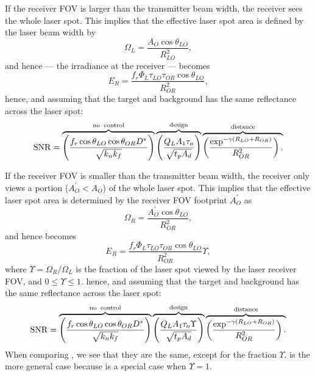 If the receiver FOV  is larger than the transmitter beam width, the receiver sees the whole laser spot. This implies that the effective laser spot area is defined by the laser beam width by
\begin{equation}
\Omega_L=\frac{A_O\cos\theta_{LO}}{R^2_{LO}},
\end{equation}
and hence  --- the irradiance at the receiver ---  becomes
\begin{equation}
E_R = \frac{
f_r  \Phi_L \tau_{LO}\tau_{OR} \cos\theta_{LO}}{R^2_{OR} }\label{lrfi1}, 
\end{equation}
hence, and assuming that the target and background has the same reflectance across the laser spot:
\begin{equation}
\operatorname{SNR}=
\overbrace{
\left(\frac{f_r \cos\theta_{LO} \cos\theta_{OR} D^\ast }{\sqrt{k_nk_f}}\right)
}^{\rm no\;\;control}
\overbrace{
\left(\frac{Q_L A_1 \tau_o }{\sqrt{t_p A_d}}\right)
}^{\rm design}
\overbrace{
\left(\frac{\exp^{-\gamma (R_{LO}+R_{OR})} }{R^2_{OR}}\right).\\
}^{\rm distance}
\label{lrfd2d}
\end{equation}


If the receiver FOV is smaller than the transmitter beam width, the receiver only views a portion ($A_O^\prime<A_O$) of the whole laser spot. This implies that the effective laser spot area is determined by the receiver FOV footprint  $A_O^\prime$ as 
\begin{equation}
\Omega_R=\frac{A_O^\prime\cos\theta_{LO}}{R^2_{OR}},
\label{eq:lrfFOVsmaller}
\end{equation}
and hence  becomes
\begin{equation}
E_R = \frac{
f_r \Phi_L \tau_{LO}\tau_{OR} \cos\theta_{LO}}{R^2_{OR} }\Upsilon , %
\label{lrfi2}
\end{equation}
where $\Upsilon =\Omega_R/\Omega_L$ is the fraction of the laser spot
viewed by the laser receiver FOV, and $0\leq\Upsilon\leq 1$. 
hence, and assuming that the target and background has the same reflectance across the laser spot:
\begin{equation}
\operatorname{SNR}=
\overbrace{
\left(\frac{f_r  \cos\theta_{LO} \cos\theta_{OR} D^\ast }{\sqrt{k_nk_f}}\right)
}^{\rm no\;\;control}
\overbrace{
\left(\frac{Q_L A_1 \tau_o \Upsilon}{\sqrt{t_p A_d}}\right)
}^{\rm design}
\overbrace{
\left(\frac{\exp^{-\gamma (R_{LO}+R_{OR})} }{R^2_{OR}}\right).\\
}^{\rm distance}
\label{lrfd2e}
\end{equation}
When comparing
, we see that they are the same, except
for the fraction $\Upsilon$.  is the more general case
because  is a special case when $\Upsilon=1$.





